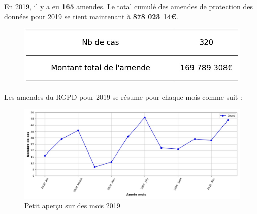 \documentclass[french]{article}
\begin{document}
\newpage




	\begin{multicols}{2}
	
	En 2019,  il y a eu \textbf{165} amendes.
	Le total cumulé des amendes de protection des données pour 2019 se tient maintenant à \textbf{878 023 14€}.
	
	\begin{figure}[H]
	\centering\includegraphics[width=1\linewidth]{graphs/counter_year}
	\end{figure}


	Les amendes du RGPD pour 2019 se résume pour chaque mois comme suit :

	\begin{figure}
	[H]\centering\includegraphics[width = 1.2\linewidth]{graphs/NbFinesPerMonth_year_graph}
	\caption{Petit aperçu sur des mois 2019}
	\end{figure}

	\end{multicols}
\end{document}
